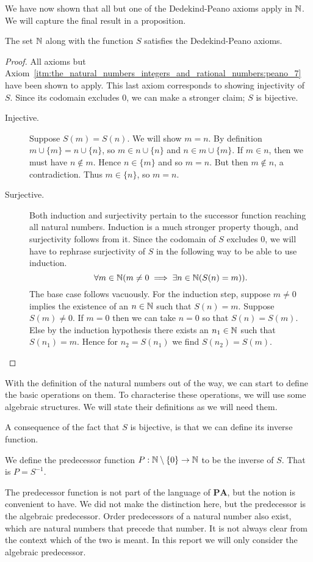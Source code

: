 \documentclass[../main.tex]{subfiles}
\begin{document}
We have now shown that all but one of the Dedekind-Peano axioms apply in $\mathbb{N}$. We will capture the final result in a proposition.
\begin{proposition}
    The set $\mathbb{N}$ along with the function $S$ satisfies the Dedekind-Peano axioms.
\end{proposition}
\begin{proof}
    All axioms but Axiom~\ref{itm:the_natural_numbers_integers_and_rational_numbers:peano_7} have been shown to apply. This last axiom corresponds to showing injectivity of $S$. Since its codomain excludes $0$, we can make a stronger claim; $S$ is bijective.
    \begin{description}
        \item[Injective.] Suppose $S(m)=S(n)$. We will show $m=n$. By definition $m\cup\{m\}=n\cup\{n\}$, so $m\in n\cup\{n\}$ and $n\in m\cup\{m\}$. If $m\in n$, then we must have $n\notin m$. Hence $n\in\{m\}$ and so $m=n$. But then $m\notin n$, a contradiction. Thus $m\in\{n\}$, so $m=n$.
        \item[Surjective.] Both induction and surjectivity pertain to the successor function reaching all natural numbers. Induction is a much stronger property though, and surjectivity follows from it. Since the codomain of $S$ excludes $0$, we will have to rephrase surjectivity of $S$ in the following way to be able to use induction.
        \begin{equation*}
            \forall m\in\mathbb{N}(m\neq0\implies\exists n\in\mathbb{N}(S(n)=m)).
        \end{equation*}
        The base case follows vacuously. For the induction step, suppose $m\neq0$ implies the existence of an $n\in\mathbb{N}$ such that $S(n)=m$. Suppose $S(m)\neq0$. If $m=0$ then we can take $n=0$ so that $S(n)=S(m)$. Else by the induction hypothesis there exists an $n_1\in\mathbb{N}$ such that $S(n_1)=m$. Hence for $n_2=S(n_1)$ we find $S(n_2)=S(m)$.
    \end{description}
\end{proof}

With the definition of the natural numbers out of the way, we can start to define the basic operations on them. To characterise these operations, we will use some algebraic structures. We will state their definitions as we will need them.

A consequence of the fact that $S$ is bijective, is that we can define its inverse function.
\begin{definition}\label{dfn:the_natural_numbers_integers_and_rational_numbers:predecessor_function}
    We define the predecessor function $P:\mathbb{N}\setminus\{0\}\to\mathbb{N}$ to be the inverse of $S$. That is $P=S^{-1}$.
\end{definition}
The predecessor function is not part of the language of $\mathbf{PA}$, but the notion is convenient to have. We did not make the distinction here, but the predecessor is the algebraic predecessor. Order predecessors of a natural number also exist, which are natural numbers that precede that number. It is not always clear from the context which of the two is meant. In this report we will only consider the algebraic predecessor.
\end{document}
